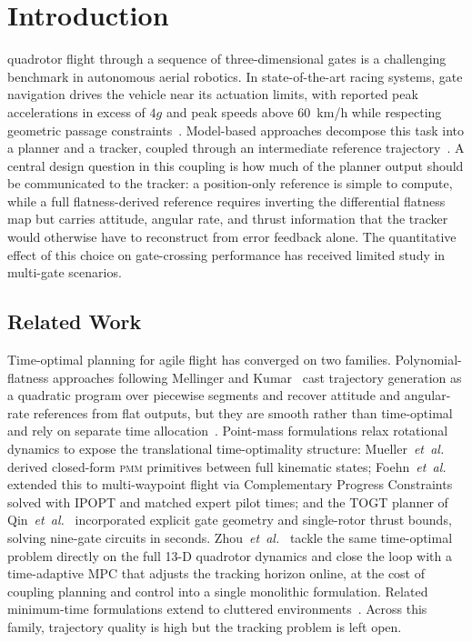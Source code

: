 \documentclass{ieeeaccess}
\newcommand{\pmm}{\textsc{pmm}}
\begin{document}
\section{Introduction}
\label{sec:introduction}

 quadrotor flight through a sequence of three-dimensional
gates is a challenging benchmark in autonomous aerial robotics.
In state-of-the-art racing systems, gate navigation drives the vehicle
near its actuation limits, with reported peak accelerations in excess
of $4g$ and peak speeds above 60~km/h while respecting geometric passage
constraints~\cite{foehn2021time,romero2022mpcc,kaufmann2023champion}.
Model-based approaches decompose this task into a planner and a tracker,
coupled through an intermediate reference trajectory~\cite{song2023reaching}.
A central design question in this coupling is how much of the
planner output should be communicated to the tracker: a position-only
reference is simple to compute, while a full flatness-derived reference
requires inverting the differential flatness map but carries attitude,
angular rate, and thrust information that the tracker would otherwise
have to reconstruct from error feedback alone.
The quantitative effect of this choice on gate-crossing performance has
received limited study in multi-gate scenarios.

\subsection{Related Work}
\label{subsec:related}

Time-optimal planning for agile flight has converged on two families.
Polynomial-flatness approaches following Mellinger and
Kumar~\cite{mellinger2011minimum} cast trajectory generation as a
quadratic program over piecewise segments and recover attitude and
angular-rate references from flat outputs, but they are smooth rather
than time-optimal and rely on separate time
allocation~\cite{richter2016polynomial,mellinger2012trajectory}.
Point-mass formulations relax rotational dynamics to expose the
translational time-optimality structure:
Mueller~\textit{et~al.}~\cite{mueller2015computationally} derived
closed-form \pmm{} primitives between full kinematic states;
Foehn~\textit{et~al.}~\cite{foehn2021time} extended this to multi-waypoint
flight via Complementary Progress Constraints solved with IPOPT and
matched expert pilot times; and the TOGT planner of
Qin~\textit{et~al.}~\cite{qin2024togt} incorporated explicit gate
geometry and single-rotor thrust bounds, solving nine-gate circuits in
seconds.
Zhou~\textit{et~al.}~\cite{zhou2023timeoptimal} tackle the same
time-optimal problem directly on the full 13-D quadrotor dynamics and
close the loop with a time-adaptive MPC that adjusts the tracking
horizon online, at the cost of coupling planning and control into a
single monolithic formulation.
Related minimum-time formulations extend to cluttered
environments~\cite{penicka2022minimum}.
Across this family, trajectory quality is high but the tracking problem
is left open.
\end{document}
